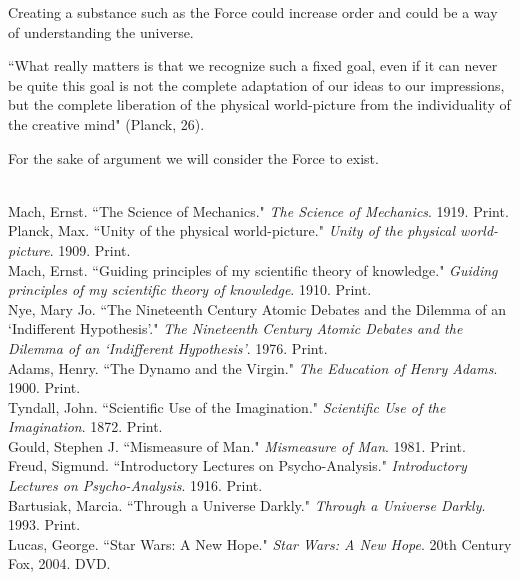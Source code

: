 \documentclass[11pt, oneside]{article}
\begin{document}
\par Creating a substance such as the Force could increase order and could be a way of understanding the universe.

\par ``What really matters is that we recognize such a fixed goal, even if it can never be quite this goal is not the complete adaptation of our ideas to our impressions, but the complete liberation of the physical world-picture from the individuality of the creative mind" (Planck, 26).

\par For the sake of argument we will consider the Force to exist. 

\begin{workscited}
\bibent \\
\bibent Mach, Ernst. ``The Science of Mechanics."  \textit{The Science of Mechanics}.  1919. Print. \\
\bibent Planck, Max. ``Unity of the physical world-picture."  \textit{Unity of the physical world-picture}.  1909. Print. \\
\bibent Mach, Ernst. ``Guiding principles of my scientific theory of knowledge."  \textit{Guiding principles of my scientific theory of knowledge}.  1910. Print. \\
\bibent Nye, Mary Jo. ``The Nineteenth Century Atomic Debates and the Dilemma of an `Indifferent Hypothesis'."  \textit{The Nineteenth Century Atomic Debates and the Dilemma of an `Indifferent Hypothesis'}.  1976. Print. \\
\bibent Adams, Henry.  ``The Dynamo and the Virgin."  \textit{The Education of Henry Adams}.  1900. Print. \\
\bibent Tyndall, John.  ``Scientific Use of the Imagination."  \textit{Scientific Use of the Imagination}.  1872. Print. \\
\bibent Gould, Stephen J.  ``Mismeasure of Man."  \textit{Mismeasure of Man}.  1981. Print. \\
\bibent Freud, Sigmund.  ``Introductory Lectures on Psycho-Analysis."  \textit{Introductory Lectures on Psycho-Analysis}.  1916. Print. \\
\bibent Bartusiak, Marcia.  ``Through a Universe Darkly."  \textit{Through a Universe Darkly}.  1993. Print. \\
\bibent Lucas, George. ``Star Wars: A New Hope."   \textit{Star Wars: A New Hope}. 20th Century Fox, 2004. DVD.
\end{workscited}
\end{document}
